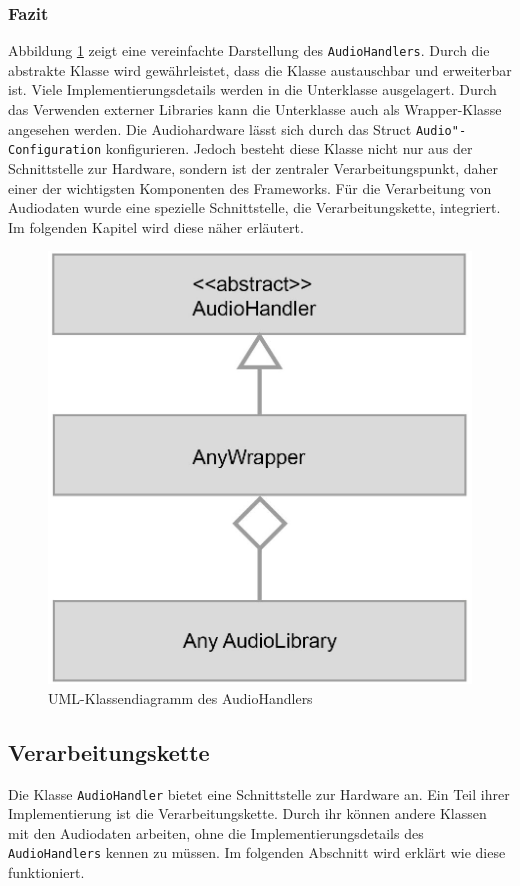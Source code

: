 \subsubsection{Fazit}
Abbildung \ref{Fig:AudioHandlerAnySimple} zeigt eine vereinfachte Darstellung des \texttt{AudioHandlers}. Durch die abstrakte Klasse wird gewährleistet, dass die Klasse austauschbar und erweiterbar ist. Viele Implementierungsdetails werden in die Unterklasse ausgelagert. Durch das Verwenden externer Libraries kann die Unterklasse auch als Wrapper-Klasse angesehen werden. Die Audiohardware lässt sich durch das Struct \texttt{Audio"-Configuration} konfigurieren. Jedoch besteht diese Klasse nicht nur aus der Schnittstelle zur Hardware, sondern ist der zentraler Verarbeitungspunkt, daher einer der wichtigsten Komponenten des Frameworks. Für die Verarbeitung von Audiodaten wurde eine spezielle Schnittstelle, die Verarbeitungskette, integriert. Im folgenden Kapitel wird diese näher erläutert.
\newline
\begin{figure}[htp]
\centering
\includegraphics[width=.45\textwidth]{../img/AudioHandlerAnySimple}
\caption{UML-Klassendiagramm des AudioHandlers}
\label{Fig:AudioHandlerAnySimple}
\end{figure}

\FloatBarrier
\subsection{Verarbeitungskette}
\label{processingChain}

Die Klasse \texttt{AudioHandler} bietet eine Schnittstelle zur Hardware an. Ein Teil ihrer Implementierung ist die Verarbeitungskette. Durch ihr können andere Klassen mit den Audiodaten arbeiten, ohne die Implementierungsdetails des \texttt{AudioHandlers} kennen zu müssen. Im folgenden Abschnitt wird erklärt wie diese funktioniert.

\FloatBarrier
